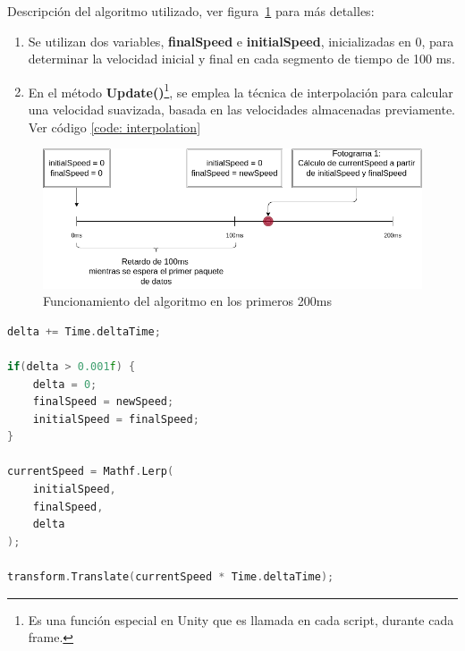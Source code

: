 \vspace{10pt}
Descripción del algoritmo utilizado, ver figura~\ref{fig: interpolation-algorithm} para más detalles:
\begin{enumerate}
    \item Se utilizan dos variables, \textbf{finalSpeed} e \textbf{initialSpeed}, inicializadas en 0, para determinar la velocidad inicial y final en cada segmento de tiempo de 100 ms.
    \item En el método \textbf{Update()}\footnote{Es una función especial en Unity que es llamada en cada script, durante cada frame.}, se emplea la técnica de interpolación para calcular una velocidad suavizada, basada en las velocidades almacenadas previamente. Ver código \ref{code: interpolation}
\end{enumerate} 

\begin{figure}[ht]
    \centering
    \includegraphics[scale=0.4]{images/interpolation-algorithm.png}
    \caption{Funcionamiento del algoritmo en los primeros 200ms}
    \label{fig: interpolation-algorithm}
\end{figure}

\begin{center}
\begin{minipage}{0.8\textwidth}
\begin{lstlisting}[language=c, label={code: interpolation}, caption={Controlador de movimiento}]
delta += Time.deltaTime;
 
if(delta > 0.001f) {
    delta = 0;
    finalSpeed = newSpeed;
    initialSpeed = finalSpeed;
}

currentSpeed = Mathf.Lerp( 
    initialSpeed, 
    finalSpeed, 
    delta
);

transform.Translate(currentSpeed * Time.deltaTime);
\end{lstlisting}
\end{minipage}
\end{center}


